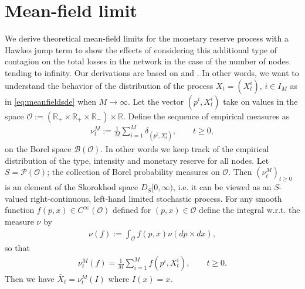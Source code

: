 \documentclass[10pt]{article}
\theoremstyle{plain}
\theoremstyle{definition}
\newcommand{\<}{\langle}
\renewcommand{\>}{\rangle}
\renewcommand{\(}{\left(}
\renewcommand{\)}{\right)}
\renewcommand{\[}{\left[}
\renewcommand{\]}{\right]}
\newcommand{\blu}[1]{\textcolor{blue}{#1}}
\begin{document}
\section{Mean-field limit}\label{sec4}
We derive theoretical mean-field limits for the monetary reserve process with a Hawkes jump term to show the effects of considering this additional type of contagion on the total losses in the network in the case of the number of nodes tending to infinity. Our derivations are based on \citet{carmona13} and \citet{capponi15}. In other words, we want to understand the behavior of the distribution of  the process $X_t=(X_t^i)$, $i\in I_M$ as in \eqref{eq:meanfieldsde} when $M\rightarrow\infty$. %
Let the vector $(p^i, X_t^i)$ take on values in the space $\mathcal{O}:=(\mathbb{R}_+\times\mathbb{R}_+\times\mathbb{R}_-)\times\mathbb{R}$. Define the sequence of empirical measures as %
\begin{align}\label{eq:nuemp}
\nu_t^M:=\frac{1}{M}\sum\limits_{i=1}^M\delta_{(p^i,X_t^i)}, \qquad t\geq 0,
\end{align}
on the Borel space $\mathcal{B}(\mathcal{O})$. In other words we keep track of the empirical
distribution of the type, intensity and monetary reserve for all nodes. Let $S=\mathcal{P}(\mathcal{O})$; the
collection of Borel probability measures on $\mathcal{O}$. Then $(\nu^M_t)_{t\geq 0}$ is an
element of the Skorokhod space $D_S[0,\infty)$, %
 i.e. it can be viewed as an $S$-valued right-continuous, left-hand
limited stochastic process. For any smooth function $f(p,x)\in C^{\infty}(\mathcal{O})$ defined
for $(p,x)\in \mathcal{O}$  define the integral w.r.t. the measure $\nu$ by
\begin{align}\label{eq:nu1f}
\nu(f):=\int_\mathcal{O}f(p,x)\nu(dp\times dx),
\end{align}
so that
\begin{align}\label{eq:nuf}
\nu_t^M(f) = \frac{1}{M}\sum\limits_{i=1}^Mf(p^i,X_t^i), \qquad t\geq 0.
\end{align}
Then we have $\bar X_t =\nu_t^M(I)$ where $I(x)= x$.
\end{document}
